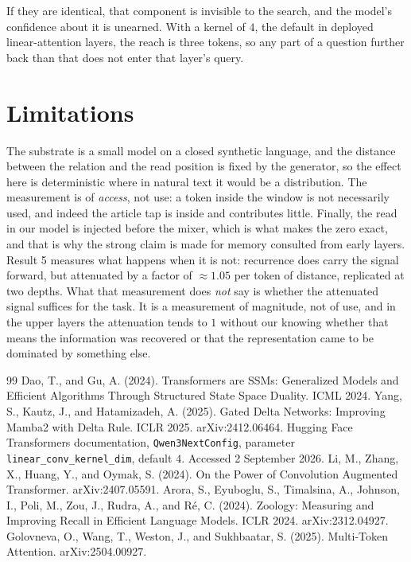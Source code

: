 \documentclass[11pt,a4paper]{article}
\begin{document}
If they are identical, that component is invisible to the search, and the model's confidence about it
is unearned. With a kernel of $4$, the default in deployed linear-attention layers, the reach is three
tokens, so any part of a question further back than that does not enter that layer's query.

\section{Limitations}

The substrate is a small model on a closed synthetic language, and the distance between the relation
and the read position is fixed by the generator, so the effect here is deterministic where in natural
text it would be a distribution. The measurement is of \emph{access}, not use: a token inside the window
is not necessarily used, and indeed the article tap is inside and contributes little. Finally, the read
in our model is injected before the mixer, which is what makes the zero exact, and that is why the
strong claim is made for memory consulted from early layers. Result 5 measures what happens when it is
not: recurrence does carry the signal forward, but attenuated by a factor of $\approx 1.05$ per token
of distance, replicated at two depths. What that measurement does \emph{not} say is whether the
attenuated signal suffices for the task. It is a measurement of magnitude, not of use, and in the
upper layers the attenuation tends to $1$ without our knowing whether that means the information was
recovered or that the representation came to be dominated by something else.

\begin{thebibliography}{99}
 Dao, T., and Gu, A. (2024). Transformers are SSMs: Generalized Models and Efficient Algorithms Through Structured State Space Duality. ICML 2024.
 Yang, S., Kautz, J., and Hatamizadeh, A. (2025). Gated Delta Networks: Improving Mamba2 with Delta Rule. ICLR 2025. arXiv:2412.06464.
 Hugging Face Transformers documentation, \texttt{Qwen3NextConfig}, parameter \texttt{linear\_conv\_kernel\_dim}, default $4$. Accessed 2 September 2026.
 Li, M., Zhang, X., Huang, Y., and Oymak, S. (2024). On the Power of Convolution Augmented Transformer. arXiv:2407.05591.
 Arora, S., Eyuboglu, S., Timalsina, A., Johnson, I., Poli, M., Zou, J., Rudra, A., and R\'e, C. (2024). Zoology: Measuring and Improving Recall in Efficient Language Models. ICLR 2024. arXiv:2312.04927.
 Golovneva, O., Wang, T., Weston, J., and Sukhbaatar, S. (2025). Multi-Token Attention. arXiv:2504.00927.
\end{thebibliography}
\end{document}
